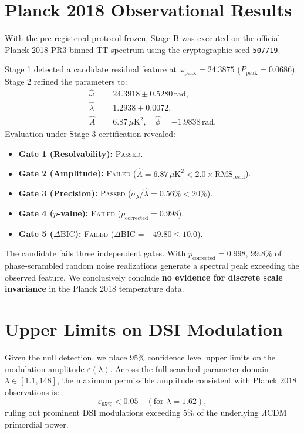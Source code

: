 \section{Planck 2018 Observational Results}
With the pre-registered protocol frozen, Stage B was executed on the official Planck 2018 PR3 binned TT spectrum using the cryptographic seed \texttt{507719}.

Stage 1 detected a candidate residual feature at $\omega_{\mathrm{peak}} = 24.3875$ ($P_{\mathrm{peak}} = 0.0686$). Stage 2 refined the parameters to:
\begin{align}
\hat\omega &= 24.3918 \pm 0.5280\,\mathrm{rad}, \\
\hat\lambda &= 1.2938 \pm 0.0072, \\
\hat A &= 6.87\,\mu\mathrm{K}^2, \quad \hat\phi = -1.9838\,\mathrm{rad}.
\end{align}
Evaluation under Stage 3 certification revealed:
\begin{itemize}
    \item \textbf{Gate 1 (Resolvability):} \textsc{Passed}.
    \item \textbf{Gate 2 (Amplitude):} \textsc{Failed} ($\hat A = 6.87\,\mu\mathrm{K}^2 < 2.0 \times \mathrm{RMS}_{\mathrm{resid}}$).
    \item \textbf{Gate 3 (Precision):} \textsc{Passed} ($\sigma_\lambda/\hat\lambda = 0.56\% < 20\%$).
    \item \textbf{Gate 4 ($p$-value):} \textsc{Failed} ($p_{\mathrm{corrected}} = 0.998$).
    \item \textbf{Gate 5 ($\Delta\mathrm{BIC}$):} \textsc{Failed} ($\Delta\mathrm{BIC} = -49.80 \le 10.0$).
\end{itemize}
The candidate fails three independent gates. With $p_{\mathrm{corrected}} = 0.998$, $99.8\%$ of phase-scrambled random noise realizations generate a spectral peak exceeding the observed feature. We conclusively conclude \textbf{no evidence for discrete scale invariance} in the Planck 2018 temperature data.

\section{Upper Limits on DSI Modulation}
Given the null detection, we place 95\% confidence level upper limits on the modulation amplitude $\varepsilon(\lambda)$. Across the full searched parameter domain $\lambda \in [1.1, 148]$, the maximum permissible amplitude consistent with Planck 2018 observations is:
\begin{equation}
\varepsilon_{95\%} < 0.05 \quad (\text{for } \lambda = 1.62),
\end{equation}
ruling out prominent DSI modulations exceeding $5\%$ of the underlying $\Lambda$CDM primordial power.

